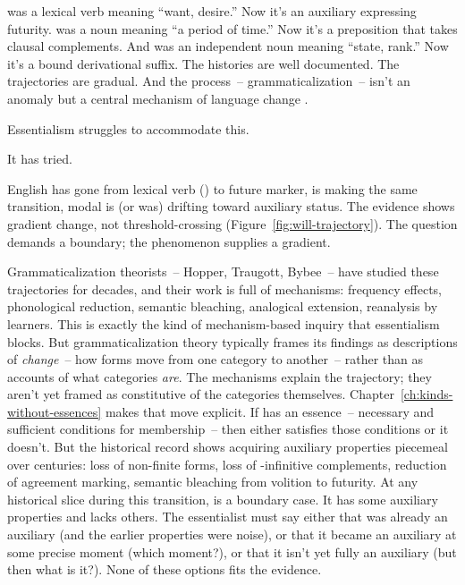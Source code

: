  was a lexical verb meaning \enquote{want, desire.} Now it's an auxiliary expressing futurity.  was a noun meaning \enquote{a period of time.} Now it's a preposition that takes clausal complements. And  was an independent noun meaning \enquote{state, rank.} Now it's a bound derivational suffix. The histories are well documented. The trajectories are gradual. And the process~-- grammaticalization~-- isn't an anomaly but a central mechanism of language change \autocite{hopper1993,bybee1994}.

Essentialism struggles to accommodate this.

It has tried.

English  has gone from lexical verb () to future marker,  is making the same transition, modal  is (or was) drifting toward auxiliary status. The evidence shows gradient change, not threshold-crossing (Figure~\ref{fig:will-trajectory}). The question demands a boundary; the phenomenon supplies a gradient.

Grammaticalization theorists~-- Hopper, Traugott, Bybee~-- have studied these trajectories for decades, and their work is full of mechanisms: frequency effects, phonological reduction, semantic bleaching, analogical extension, reanalysis by learners. This is exactly the kind of mechanism-based inquiry that essentialism blocks. But grammaticalization theory typically frames its findings as descriptions of \emph{change}~-- how forms move from one category to another~-- rather than as accounts of what categories \emph{are}. The mechanisms explain the trajectory; they aren't yet framed as constitutive of the categories themselves. Chapter~\ref{ch:kinds-without-essences} makes that move explicit. If  has an essence~-- necessary and sufficient conditions for membership~-- then  either satisfies those conditions or it doesn't. But the historical record shows  acquiring auxiliary properties piecemeal over centuries: loss of non-finite forms, loss of -infinitive complements, reduction of agreement marking, semantic bleaching from volition to futurity. At any historical slice during this transition,  is a boundary case. It has some auxiliary properties and lacks others. The essentialist must say either that  was already an auxiliary (and the earlier properties were noise), or that it became an auxiliary at some precise moment (which moment?), or that it isn't yet fully an auxiliary (but then what is it?). None of these options fits the evidence.

